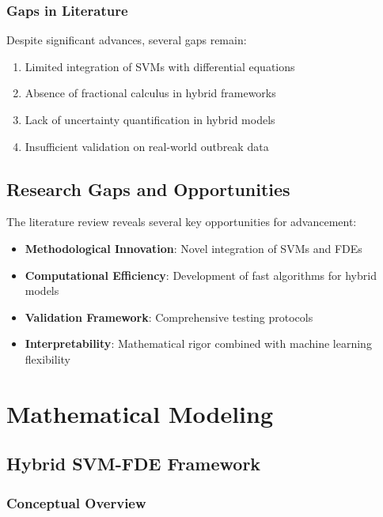 \documentclass[12pt,a4paper]{report}
\begin{document}
\subsection{Gaps in Literature}

Despite significant advances, several gaps remain:

\begin{enumerate}
    \item Limited integration of SVMs with differential equations
    \item Absence of fractional calculus in hybrid frameworks
    \item Lack of uncertainty quantification in hybrid models
    \item Insufficient validation on real-world outbreak data
\end{enumerate}

\section{Research Gaps and Opportunities}

The literature review reveals several key opportunities for advancement:

\begin{itemize}
    \item \textbf{Methodological Innovation}: Novel integration of SVMs and FDEs
    \item \textbf{Computational Efficiency}: Development of fast algorithms for hybrid models
    \item \textbf{Validation Framework}: Comprehensive testing protocols
    \item \textbf{Interpretability}: Mathematical rigor combined with machine learning flexibility
\end{itemize}

\newpage

\chapter{Mathematical Modeling}

\section{Hybrid SVM-FDE Framework}

\subsection{Conceptual Overview}
\end{document}
